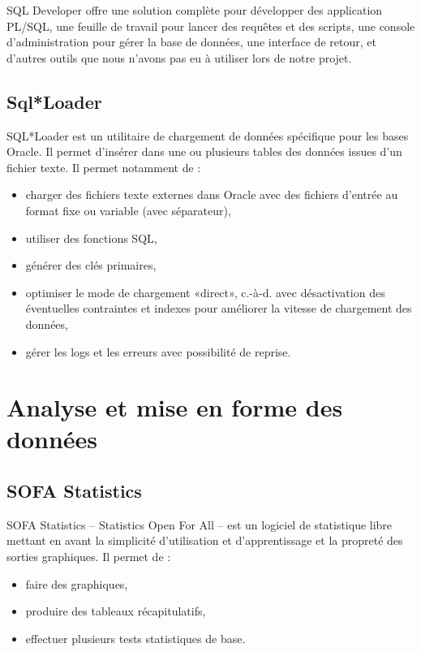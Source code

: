 		SQL Developer offre une solution complète pour développer des application PL/SQL, une feuille de travail pour lancer des requêtes et des scripts, une console d\rq{}administration pour gérer la base de données, une interface de retour, et d\rq{}autres outils que nous n\rq{}avons pas eu à utiliser lors de notre projet.
	
	
	\subsection{Sql*Loader}
		SQL*Loader est un utilitaire de chargement de données spécifique pour les bases Oracle. Il permet d'insérer dans une ou plusieurs tables des données issues d'un fichier texte.
		Il permet notamment de :
		\begin{itemize}
			\item charger des fichiers texte externes dans Oracle avec des fichiers d'entrée au format fixe ou variable (avec séparateur),
			\item utiliser des fonctions SQL,
			\item générer des clés primaires,
			\item optimiser le mode de chargement «direct», c.-à-d. avec désactivation des éventuelles contraintes et indexes pour améliorer la vitesse de chargement des données,
			\item gérer les logs et les erreurs avec possibilité de reprise.
		\end{itemize}



\section{Analyse et mise en forme des données}
	
	\subsection{SOFA Statistics}
		SOFA Statistics -- Statistics Open For All -- est un logiciel de statistique libre mettant en avant la simplicité d'utilisation et d'apprentissage et la propreté des sorties graphiques.
		Il permet de :
		\begin{itemize}
			\item faire des graphiques,
			\item produire des tableaux récapitulatifs,
			\item effectuer plusieurs tests statistiques de base.
		\end{itemize}
		
